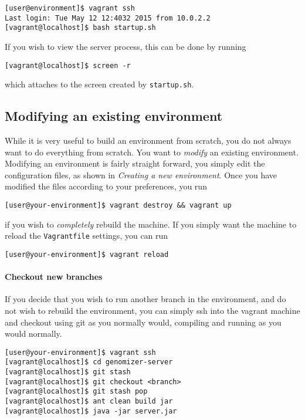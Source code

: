 \begin{verbatim}
[user@environment]$ vagrant ssh
Last login: Tue May 12 12:4032 2015 from 10.0.2.2
[vagrant@localhost]$ bash startup.sh
\end{verbatim}

If you wish to view the server process, this can be done by running

\begin{verbatim}
[vagrant@localhost]$ screen -r
\end{verbatim}

which attaches to the screen created by \texttt{startup.sh}.

\subsection{Modifying an existing
environment}\label{modifying-an-existing-environment}

While it is very useful to build an environment from scratch, you do not
always want to do everything from scratch. You want to \emph{modify} an
existing environment. Modifying an environment is fairly straight
forward, you simply edit the configuration files, as shown in
\emph{Creating a new environment}. Once you have modified the files
according to your preferences, you run

\begin{verbatim}
[user@your-environment]$ vagrant destroy && vagrant up
\end{verbatim}

if you wish to \emph{completely} rebuild the machine. If you simply want
the machine to reload the \texttt{Vagrantfile} settings, you can run

\begin{verbatim}
[user@your-environment]$ vagrant reload
\end{verbatim}

\paragraph{Checkout new branches}\label{checkout-new-branches}

If you decide that you wish to run another branch in the environment,
and do not wish to rebuild the environment, you can simply ssh into the
vagrant machine and checkout using git as you normally would, compiling
and running as you would normally.

\begin{verbatim}
[user@your-environment]$ vagrant ssh
[vagrant@localhost]$ cd genomizer-server
[vagrant@localhost]$ git stash
[vagrant@localhost]$ git checkout <branch>
[vagrant@localhost]$ git stash pop
[vagrant@localhost]$ ant clean build jar
[vagrant@localhost]$ java -jar server.jar
\end{verbatim}

